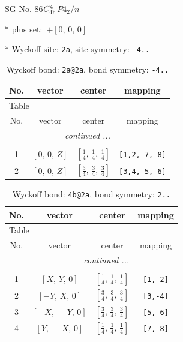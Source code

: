 \documentclass[fleqn,8pt]{jsarticle}
\begin{document}
\setcounter{MaxMatrixCols}{32}

\renewcommand{\tablename}{Table~}
\renewcommand{\figurename}{Figure~}
\begin{center}
\LARGE
SG No. 86\quad$C_{\rm 4h}^{4}$\quad$P4_2/n$\quad[ tetragonal ]
\end{center}

* plus set:\,\,\,$+\left[ 0,\, 0,\, 0 \right]$


* Wyckoff site: {\tt 2a}, site symmetry: {\tt -4..}
\renewcommand{\arraystretch}{1.2}
\begin{longtable}{cccc}
\caption{Wyckoff bond: {\tt 2a@2a}, bond symmetry: {\tt -4..}}
 \\
 \hline \hline
No. & vector & center & mapping \\ \hline \endfirsthead

\multicolumn{3}{l}{\tablename\ \thetable{}} \\
 \hline \hline
No. & vector & center & mapping \\ \hline \endhead

 \hline \hline
\multicolumn{3}{r}{\footnotesize\it continued ...} \\ \endfoot

 \hline \hline
\multicolumn{3}{r}{} \\ \endlastfoot

1 & $\left[ 0,\, 0,\, Z \right]$ & $\left[ \frac{1}{4},\, \frac{1}{4},\, \frac{1}{4} \right]$ & {\tt [1,2,-7,-8]} \\ \hline
2 & $\left[ 0,\, 0,\, Z \right]$ & $\left[ \frac{3}{4},\, \frac{3}{4},\, \frac{3}{4} \right]$ & {\tt [3,4,-5,-6]} \\
\end{longtable}
\renewcommand{\arraystretch}{1.2}
\begin{longtable}{cccc}
\caption{Wyckoff bond: {\tt 4b@2a}, bond symmetry: {\tt 2..}}
 \\
 \hline \hline
No. & vector & center & mapping \\ \hline \endfirsthead

\multicolumn{3}{l}{\tablename\ \thetable{}} \\
 \hline \hline
No. & vector & center & mapping \\ \hline \endhead

 \hline \hline
\multicolumn{3}{r}{\footnotesize\it continued ...} \\ \endfoot

 \hline \hline
\multicolumn{3}{r}{} \\ \endlastfoot

1 & $\left[ X,\, Y,\, 0 \right]$ & $\left[ \frac{1}{4},\, \frac{1}{4},\, \frac{1}{4} \right]$ & {\tt [1,-2]} \\ \hline
2 & $\left[ - Y,\, X,\, 0 \right]$ & $\left[ \frac{3}{4},\, \frac{3}{4},\, \frac{3}{4} \right]$ & {\tt [3,-4]} \\ \hline
3 & $\left[ - X,\, - Y,\, 0 \right]$ & $\left[ \frac{3}{4},\, \frac{3}{4},\, \frac{3}{4} \right]$ & {\tt [5,-6]} \\ \hline
4 & $\left[ Y,\, - X,\, 0 \right]$ & $\left[ \frac{1}{4},\, \frac{1}{4},\, \frac{1}{4} \right]$ & {\tt [7,-8]} \\
\end{longtable}
\end{document}
